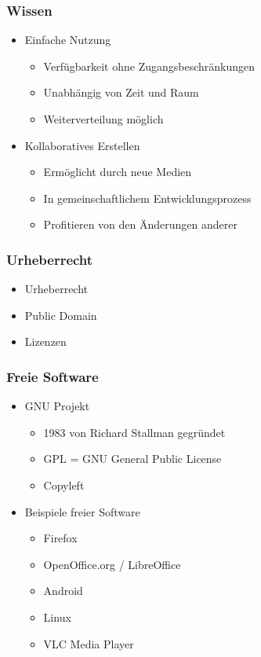 \documentclass[table]{beamer}
\begin{document}
\begin{frame}
    \frametitle{Wissen}
    \begin{itemize}
      \item<2-> Einfache Nutzung
      \begin{itemize}
        \item<3-> Verfügbarkeit ohne Zugangsbeschränkungen
        \item<4-> Unabhängig von Zeit und Raum
        \item<5-> Weiterverteilung möglich
      \end{itemize}
      \item<6-> Kollaboratives Erstellen
      \begin{itemize}
        \item<7-> Ermöglicht durch neue Medien
        \item<8-> In gemeinschaftlichem Entwicklungsprozess
        \item<9-> Profitieren von den Änderungen anderer
      \end{itemize}
    \end{itemize}
\end{frame}

\begin{frame}
    \frametitle{Urheberrecht}
    \begin{itemize}
      \item<2-> Urheberrecht
      \item<3-> Public Domain
      \item<4-> Lizenzen
    \end{itemize}
\end{frame}

\begin{frame}
    \frametitle{Freie Software}
    \begin{itemize}
      \item<2-> GNU Projekt
      \begin{itemize}
        \item<3-> 1983 von Richard Stallman gegründet
        \item<4-> GPL = GNU General Public License
        \item<5-> Copyleft
      \end{itemize}
      \item<6-> Beispiele freier Software
      \begin{itemize}
        \item Firefox
        \item OpenOffice.org / LibreOffice
        \item Android
        \item Linux
        \item VLC Media Player
      \end{itemize}
    \end{itemize}
\end{frame}
\end{document}

